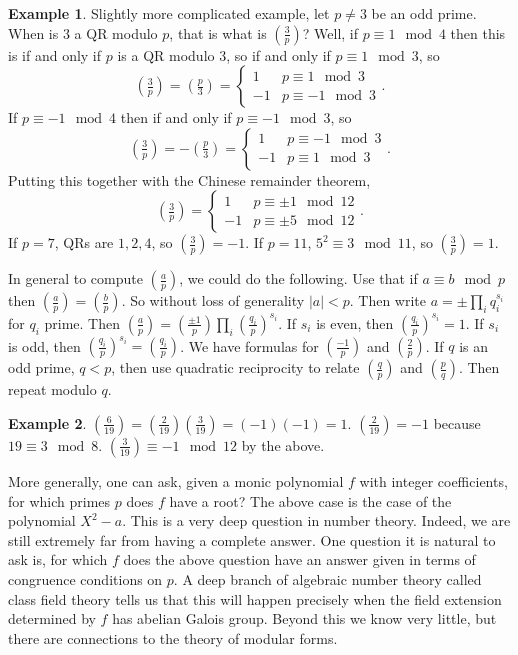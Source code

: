 \documentclass{article}
\newcommand{\rb}[1]{\left( #1 \right)}
\newcommand{\abs}[1]{\left\lvert #1 \right\rvert}
\newcommand{\legendre}[2]{\rb{\tfrac{#1}{#2}}}
\theoremstyle{definition}\newtheorem{definition}{Definition}
\theoremstyle{definition}\newtheorem*{remark}{Remark}
\theoremstyle{definition}\newtheorem*{example}{Example}
\theoremstyle{definition}\newtheorem*{note}{Note}
\begin{document}
\begin{example}
Slightly more complicated example, let $ p \ne 3 $ be an odd prime. When is $ 3 $ a QR modulo $ p $, that is what is $ \legendre{3}{p} $? Well, if $ p \equiv 1 \mod 4 $ then this is if and only if $ p $ is a QR modulo $ 3 $, so if and only if $ p \equiv 1 \mod 3 $, so
$$ \legendre{3}{p} = \legendre{p}{3} = \begin{cases} 1 & p \equiv 1 \mod 3 \\ -1 & p \equiv -1 \mod 3 \end{cases}. $$
If $ p \equiv -1 \mod 4 $ then if and only if $ p \equiv -1 \mod 3 $, so
$$ \legendre{3}{p} = -\legendre{p}{3} = \begin{cases} 1 & p \equiv -1 \mod 3 \\ -1 & p \equiv 1 \mod 3 \end{cases}. $$
Putting this together with the Chinese remainder theorem,
$$ \legendre{3}{p} = \begin{cases} 1 & p \equiv \pm 1 \mod 12 \\ -1 & p \equiv \pm 5 \mod 12 \end{cases}. $$
If $ p = 7 $, QRs are $ 1, 2, 4 $, so $ \legendre{3}{p} = -1 $. If $ p = 11 $, $ 5^2 \equiv 3 \mod 11 $, so $ \legendre{3}{p} = 1 $.
\end{example}

In general to compute $ \legendre{a}{p} $, we could do the following. Use that if $ a \equiv b \mod p $ then $ \legendre{a}{p} = \legendre{b}{p} $. So without loss of generality $ \abs{a} < p $. Then write $ a = \pm \prod_i q_i^{s_i} $ for $ q_i $ prime. Then $ \legendre{a}{p} = \legendre{\pm 1}{p} \prod_i \legendre{q_i}{p}^{s_i} $. If $ s_i $ is even, then $ \legendre{q_i}{p}^{s_i} = 1 $. If $ s_i $ is odd, then $ \legendre{q_i}{p}^{s_i} = \legendre{q_i}{p} $. We have formulas for $ \legendre{-1}{p} $ and $ \legendre{2}{p} $. If $ q $ is an odd prime, $ q < p $, then use quadratic reciprocity to relate $ \legendre{q}{p} $ and $ \legendre{p}{q} $. Then repeat modulo $ q $.

\begin{example}
$ \legendre{6}{19} = \legendre{2}{19}\legendre{3}{19} = \rb{-1}\rb{-1} = 1 $. $ \legendre{2}{19} = -1 $ because $ 19 \equiv 3 \mod 8 $. $ \legendre{3}{19} \equiv -1 \mod 12 $ by the above.
\end{example}

More generally, one can ask, given a monic polynomial $ f $ with integer coefficients, for which primes $ p $ does $ f $ have a root? The above case is the case of the polynomial $ X^2 - a $. This is a very deep question in number theory. Indeed, we are still extremely far from having a complete answer. One question it is natural to ask is, for which $ f $ does the above question have an answer given in terms of congruence conditions on $ p $. A deep branch of algebraic number theory called class field theory tells us that this will happen precisely when the field extension determined by $ f $ has abelian Galois group. Beyond this we know very little, but there are connections to the theory of modular forms.
\end{document}
